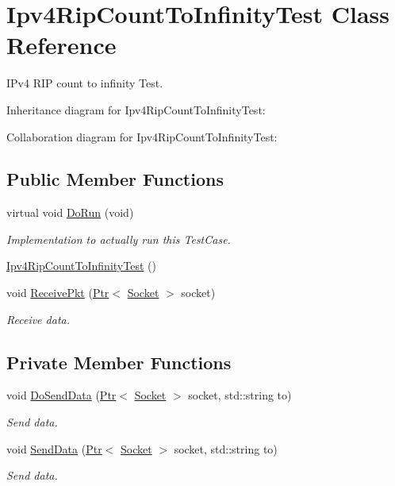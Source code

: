 \hypertarget{classIpv4RipCountToInfinityTest}{}\section{Ipv4\+Rip\+Count\+To\+Infinity\+Test Class Reference}
\label{classIpv4RipCountToInfinityTest}


I\+Pv4 R\+IP count to infinity Test.  




Inheritance diagram for Ipv4\+Rip\+Count\+To\+Infinity\+Test\+:


Collaboration diagram for Ipv4\+Rip\+Count\+To\+Infinity\+Test\+:
\subsection*{Public Member Functions}
\begin{DoxyCompactItemize}
\item 
virtual void \hyperlink{classIpv4RipCountToInfinityTest_a98754dfc16633ff58db8cfd697dd9862}{Do\+Run} (void)
\begin{DoxyCompactList}\small\item\em Implementation to actually run this Test\+Case. \end{DoxyCompactList}\item 
\hyperlink{classIpv4RipCountToInfinityTest_aa7ae68dd85f00401be6deeae2ae9b40d}{Ipv4\+Rip\+Count\+To\+Infinity\+Test} ()
\item 
void \hyperlink{classIpv4RipCountToInfinityTest_a34fe6a878c2a4b2151cb2007e761dc2e}{Receive\+Pkt} (\hyperlink{classns3_1_1Ptr}{Ptr}$<$ \hyperlink{classns3_1_1Socket}{Socket} $>$ socket)
\begin{DoxyCompactList}\small\item\em Receive data. \end{DoxyCompactList}\end{DoxyCompactItemize}
\subsection*{Private Member Functions}
\begin{DoxyCompactItemize}
\item 
void \hyperlink{classIpv4RipCountToInfinityTest_aa594fc638f29413047bcf1e9468b77a1}{Do\+Send\+Data} (\hyperlink{classns3_1_1Ptr}{Ptr}$<$ \hyperlink{classns3_1_1Socket}{Socket} $>$ socket, std\+::string to)
\begin{DoxyCompactList}\small\item\em Send data. \end{DoxyCompactList}\item 
void \hyperlink{classIpv4RipCountToInfinityTest_ab4507d1a122b2329377d410c5678ffa6}{Send\+Data} (\hyperlink{classns3_1_1Ptr}{Ptr}$<$ \hyperlink{classns3_1_1Socket}{Socket} $>$ socket, std\+::string to)
\begin{DoxyCompactList}\small\item\em Send data. \end{DoxyCompactList}\end{DoxyCompactItemize}

